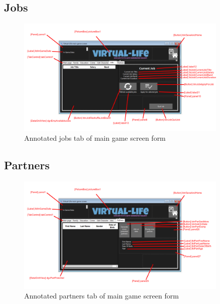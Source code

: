 \subsection{Jobs}
\begin{figure}[H]
    \centering
    \includegraphics[width=0.9\textwidth]{images/forms/main-jobs.png}
    \caption{Annotated jobs tab of main game screen form}
    \label{fig:forms-main-jobs}
\end{figure}

\subsection{Partners}
\begin{figure}[H]
    \centering
    \includegraphics[width=0.9\textwidth]{images/forms/main-partners.png}
    \caption{Annotated partners tab of main game screen form}
    \label{fig:forms-main-partners}
\end{figure}
